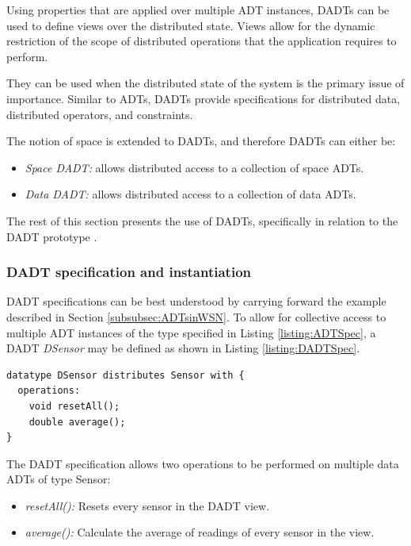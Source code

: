 Using properties that are applied over multiple ADT instances, DADTs can be
used to define views over the distributed state. Views allow for the dynamic
restriction of the scope of distributed operations that the application
requires to perform. 

They can be used when the distributed state 
of the system is the primary issue of importance. Similar to ADTs, DADTs 
provide specifications for distributed data, distributed operators, and 
constraints.

The notion of space is extended to DADTs, and therefore DADTs can either be:

\begin{itemize}
  \item \emph{Space DADT:} allows distributed access to a collection of space
  ADTs. 
  \item \emph{Data DADT:} allows distributed access to a collection of data ADTs.
\end{itemize}

The rest of this section presents the use of DADTs, specifically in relation to
the DADT prototype \cite{migliavacca_DADT:2006}.

\subsubsection{DADT specification and instantiation} \label{subsubsec:dadtspecandinst}

DADT specifications can be best understood by carrying forward the example
described in Section \ref{subsubsec:ADTsinWSN}. To allow for collective access
to multiple ADT instances of the type specified in Listing
\ref{listing:ADTSpec}, a DADT \emph{DSensor} may be defined as shown in Listing
\ref{listing:DADTSpec}.   
 
\begin{lstlisting}[frame=trbl, basewidth={0.55em, 0.6em}, captionpos=b, 
basicstyle=\ttfamily\footnotesize, breaklines, caption = Data DADT 
specification (reproduced from \cite{migliavacca_DADT:2006}), label = 
listing:DADTSpec]
datatype DSensor distributes Sensor with {
  operations:
	void resetAll();
	double average();
}
\end{lstlisting}

The DADT specification allows two operations to be performed on multiple data 
ADTs of type Sensor:  
\begin{itemize}
\item \emph{resetAll():} Resets every sensor in the DADT view.
\item \emph{average():} Calculate the average of readings of every sensor in the
view.
\end{itemize}

